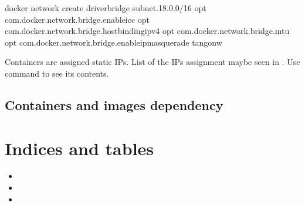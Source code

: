 \documentclass[letterpaper,10pt,english]{sphinxmanual}
\begin{document}
\begin{sphinxVerbatim}[commandchars=\\\{\}]
docker network create \PYGZhy{}\PYGZhy{}driverbridge \PYGZhy{}\PYGZhy{}subnet.18.0.0/16 \PYGZhy{}\PYGZhy{}opt com.docker.network.bridge.enable\PYGZus{}icc 
\PYGZhy{}\PYGZhy{}opt com.docker.network.bridge.host\PYGZus{}binding\PYGZus{}ipv4 \PYGZhy{}\PYGZhy{}opt com.docker.network.bridge.mtu 
\PYGZhy{}\PYGZhy{}opt com.docker.network.bridge.enable\PYGZus{}ip\PYGZus{}masquerade  tango\PYGZus{}nw
\end{sphinxVerbatim}

Containers are assigned static IPs. List of the IPs assignment maybe seen in . Use command
 to see its contents.


\section{Containers and images dependency}
\label{\detokenize{index:containers-and-images-dependency}}

\chapter{Indices and tables}
\label{\detokenize{index:indices-and-tables}}\begin{itemize}
\item {} 

\item {} 

\item {} 

\end{itemize}



\renewcommand{\indexname}{Index}
\printindex
\end{document}
